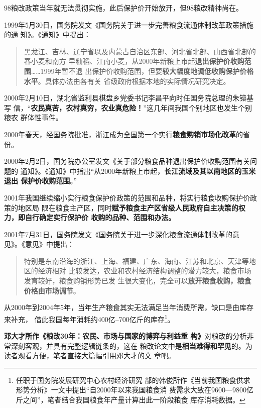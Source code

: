 98粮改政策当年就无法贯彻实施，此后保护价开始放开，但98粮改精神尚在。

1999年5月30日，国务院发文《国务院关于进一步完善粮食流通体制改革政策措施的通
知》。《通知》中提出：
\begin{quotation}
  黑龙江、吉林、辽宁省以及内蒙古自治区东部、河北省北部、山西省北部的春小麦和南方
  早籼稻、江南小麦，从2000年新粮上市起\textbf{退出保护价收购范围}……1999年暂不退
  出保护价收购范围，但要\textbf{较大幅度地调低收购保护价格水平}。具体办法由各有关
  省级政府根据本地的实际情况研究决定。
\end{quotation}

2000年2月10日，湖北省监利县棋盘乡党委书记李昌平向时任国务院总理的朱镕基写
信，“\textbf{农民真苦，农村真穷，农业真危险！}”这几年间我国个别地区也发生个别粮农
群体性事件。

2000年春天，经国务院批准，浙江成为全国第一个实行\textbf{粮食购销市场化改革}的省
份。

2000年2月2日，国务院办公室发文《关于部分粮食品种退出保护价收购范围有关问题的
通知》。《通知》中指出“从2000年新粮上市起，\textbf{长江流域及其以南地区的玉米退出
  保护价收购范围}。”

2001年我国继续缩小实行粮食保护价政策的范围和品种，将实行粮食收购保护价政策的地区局
限在粮食主产区，同时\textbf{赋予粮食主产区省级人民政府自主决策的权力，即自行确定实行保护价
  收购的品种、范围和办法。}

2001年7月31日，国务院发文《国务院关于进一步深化粮食流通体制改革的意
见》。《意见》中提出：
\begin{quotation}
  特别是东南沿海的浙江、上海、福建、广东、海南、江苏和北京、天津等地区的经济相对
  比较发达，农业和农村经济结构调整的潜力较大，粮食市场发育较好，粮食购销形势已发
  生很大变化，完全可以\textbf{放开粮食收购，粮食价格由市场调节}。
\end{quotation}


从2000年到2004年5年，当年生产粮食其实无法满足当年消费所需，缺口是由库存来补充，
借此我国每年消耗约400亿--700亿斤的库存\footnote{任职于国务院发展研究中心农村经济研究
  部的韩俊所作《当前我国粮食供求形势分析》一文中提出“自2000年以来我国粮食消
  费需求大致在9600—9800亿斤之间”，笔者结合我国粮食年产量计算出此一阶段粮食
  库存消耗数据。}。

\textbf{邓大才所作《粮改30年：农民、市场与国家的博弈与利益重
  构》}\cite{dacailianggai}对粮改的分析非常深刻客观，并具有完整逻辑链条的，这在
粮改论文中是\textbf{相当难得和罕见}的。为读者观看方便，笔者直接大篇幅引用邓大才的文
章吧。

